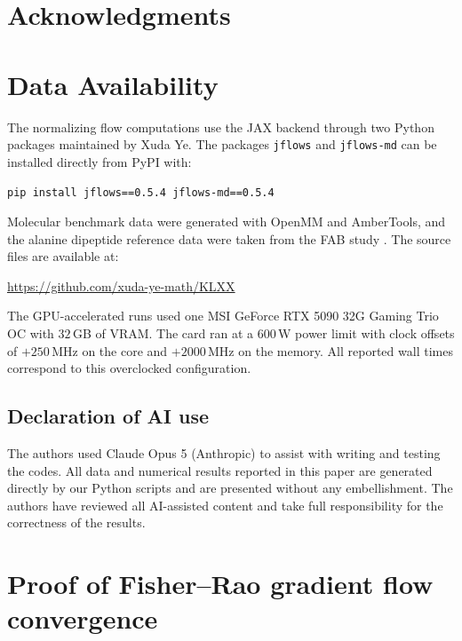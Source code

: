 \documentclass{article}
\begin{document}
\section*{Acknowledgments}

\section*{Data Availability}
The normalizing flow computations use the JAX backend through two Python packages maintained by Xuda Ye. The packages \texttt{jflows} and \texttt{jflows-md} can be installed directly from PyPI with:
\begin{tcolorbox}[colback=gray!12,boxrule=0pt,arc=2pt,left=6pt,right=6pt,top=4pt,bottom=4pt]
\texttt{pip install jflows==0.5.4 jflows-md==0.5.4}
\end{tcolorbox}
\noindent
Molecular benchmark data were generated with OpenMM and AmberTools, and the alanine dipeptide reference data were taken from the FAB study \citep{midgley2022flow}. The source files are available at:
\begin{tcolorbox}[colback=gray!12,boxrule=0pt,arc=2pt,left=6pt,right=6pt,top=4pt,bottom=4pt]
\url{https://github.com/xuda-ye-math/KLXX}
\end{tcolorbox}
\noindent
The GPU-accelerated runs used one MSI GeForce RTX 5090 32G Gaming Trio OC with $32$\,GB of VRAM. The card ran at a $600$\,W power
limit with clock offsets of $+250$\,MHz on the core and $+2000$\,MHz on the
memory. All reported wall times correspond to this overclocked
configuration.

\subsection*{Declaration of AI use}
The authors used Claude Opus 5 (Anthropic) to assist with writing and testing the codes. All data and numerical results reported in this paper are generated directly by our Python scripts and are presented without any embellishment. The authors have reviewed all AI-assisted content and take full responsibility for the correctness of the results.

{
	
	
}

\appendix

\section{Proof of Fisher--Rao gradient flow convergence}
\label{sec: appendix-FR}
\end{document}
